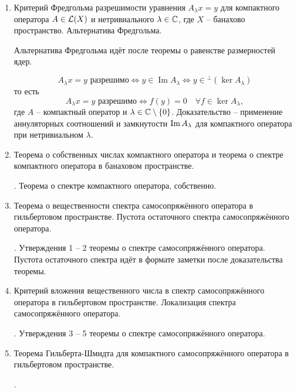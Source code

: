 \begin{enumerate}
    . И ещё предыдущая теорема, полагаю.

    \item Критерий Фредгольма разрешимости уравнения $A_\lambda x = y$ для компактного оператора $A \in \mathcal{L}(X)$ и нетривиального $\lambda \in \mathbb{C}$, где $X$ -- банахово пространство. Альтернатива Фредгольма.
    
    Альтернатива Фредгольма идёт после теоремы о равенстве размерностей ядер.
    \begin{notet}
        \[
        A_\lambda x=y \text{ разрешимо}
        \Longleftrightarrow
        y\in \operatorname{Im}A_\lambda
        \Longleftrightarrow
        y\in {}^\perp(\ker A_\lambda)
        \]
        то есть
        \[
        A_\lambda x=y \text{ разрешимо}
        \Longleftrightarrow
        f(y)=0\quad \forall f\in\ker A_\lambda,
        \]
        где $A$ -- компактный оператор и $\lambda \in \mathbb{C} \setminus \{0\}$. Доказательство -- применение аннуляторных соотношений и замкнутости $\operatorname{Im} A_\lambda$ для компактного оператора при нетривиальном $\lambda$.
    \end{notet}

    \item Теорема о собственных числах компактного оператора и теорема о спектре компактного оператора в банаховом пространстве.
    
    . Теорема о спектре компактного оператора, собственно.

    \item Теорема о вещественности спектра самосопряжённого оператора в гильбертовом пространстве. Пустота остаточного спектра самосопряжённого оператора.
    
    . Утверждения 1 -- 2 теоремы о спектре самосопряжённого оператора.
    Пустота остаточного спектра идёт в формате заметки после доказательства теоремы.

    \item Критерий вложения вещественного числа в спектр самосопряжённого оператора в гильбертовом пространстве. Локализация спектра самосопряжённого оператора.
    
    . Утверждения 3 -- 5 теоремы о спектре самосопряжённого оператора.

    \item Теорема Гильберта-Шмидта для компактного самосопряжённого оператора в гильбертовом пространстве.
    
    . 


\end{enumerate}

